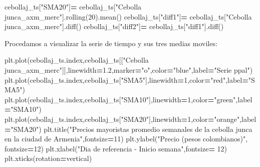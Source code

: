 \documentclass[
]{book}
\newenvironment{Shaded}{\begin{snugshade}}{\end{snugshade}}
\newcommand{\DecValTok}[1]{\textcolor[rgb]{0.00,0.00,0.81}{#1}}
\newcommand{\FloatTok}[1]{\textcolor[rgb]{0.00,0.00,0.81}{#1}}
\newcommand{\NormalTok}[1]{#1}
\newcommand{\OperatorTok}[1]{\textcolor[rgb]{0.81,0.36,0.00}{\textbf{#1}}}
\newcommand{\StringTok}[1]{\textcolor[rgb]{0.31,0.60,0.02}{#1}}
\begin{document}
\begin{Shaded}
\begin{Highlighting}[]
\NormalTok{cebollaj\_ts[}\StringTok{"SMA20"}\NormalTok{]}\OperatorTok{=}\NormalTok{ cebollaj\_ts[}\StringTok{"Cebolla junca\_axm\_merc"}\NormalTok{].rolling(}\DecValTok{20}\NormalTok{).mean()}
\NormalTok{cebollaj\_ts[}\StringTok{"diff1"}\NormalTok{]}\OperatorTok{=}\NormalTok{ cebollaj\_ts[}\StringTok{"Cebolla junca\_axm\_merc"}\NormalTok{].diff()}
\NormalTok{cebollaj\_ts[}\StringTok{"diff2"}\NormalTok{]}\OperatorTok{=}\NormalTok{ cebollaj\_ts[}\StringTok{"diff1"}\NormalTok{].diff()}
\end{Highlighting}
\end{Shaded}

Procedamos a visualizar la serie de tiempo y sus tres medias moviles:

\begin{Shaded}
\begin{Highlighting}[]

\NormalTok{plt.plot(cebollaj\_ts.index,cebollaj\_ts[[}\StringTok{"Cebolla junca\_axm\_merc"}\NormalTok{]],linewidth}\OperatorTok{=}\FloatTok{1.2}\NormalTok{,marker}\OperatorTok{=}\StringTok{"o"}\NormalTok{,color}\OperatorTok{=}\StringTok{"blue"}\NormalTok{,label}\OperatorTok{=}\StringTok{"Serie ppal"}\NormalTok{)}
\NormalTok{plt.plot(cebollaj\_ts.index,cebollaj\_ts[}\StringTok{"SMA5"}\NormalTok{],linewidth}\OperatorTok{=}\DecValTok{1}\NormalTok{,color}\OperatorTok{=}\StringTok{"red"}\NormalTok{,label}\OperatorTok{=}\StringTok{"SMA5"}\NormalTok{)}
\NormalTok{plt.plot(cebollaj\_ts.index,cebollaj\_ts[}\StringTok{"SMA10"}\NormalTok{],linewidth}\OperatorTok{=}\DecValTok{1}\NormalTok{,color}\OperatorTok{=}\StringTok{"green"}\NormalTok{,label}\OperatorTok{=}\StringTok{"SMA10"}\NormalTok{)}
\NormalTok{plt.plot(cebollaj\_ts.index,cebollaj\_ts[}\StringTok{"SMA20"}\NormalTok{],linewidth}\OperatorTok{=}\DecValTok{1}\NormalTok{,color}\OperatorTok{=}\StringTok{"orange"}\NormalTok{,label}\OperatorTok{=}\StringTok{"SMA20"}\NormalTok{)}
\NormalTok{plt.title(}\StringTok{"Precios mayoristas promedio semanales de la cebolla junca en la ciudad de Armenia"}\NormalTok{,fontsize}\OperatorTok{=}\DecValTok{11}\NormalTok{)}
\NormalTok{plt.ylabel(}\StringTok{"Precio (pesos colombianos)"}\NormalTok{, fontsize}\OperatorTok{=}\DecValTok{12}\NormalTok{)}
\NormalTok{plt.xlabel(}\StringTok{"Dia de referencia {-} Inicio semana"}\NormalTok{,fontsize}\OperatorTok{=} \DecValTok{12}\NormalTok{)}
\NormalTok{plt.xticks(rotation}\OperatorTok{=}\StringTok{\textquotesingle{}vertical\textquotesingle{}}\NormalTok{)}
\end{Highlighting}
\end{Shaded}
\end{document}
